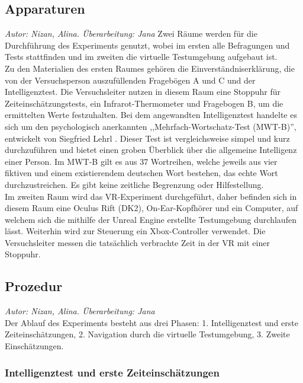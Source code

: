 \documentclass{Paper}
\begin{document}
        \subsection{Apparaturen}
                \textit{Autor: Nizan, Alina. Überarbeitung: Jana}
Zwei Räume werden für die Durchführung des Experiments genutzt, wobei im ersten alle Befragungen und Tests stattfinden und im zweiten die virtuelle Testumgebung aufgebaut ist.\\
Zu den Materialien des ersten Raumes gehören die Einverständniserklärung, die von der Versuchsperson auszufüllenden Fragebögen A und C und der Intelligenztest.
Die Versuchsleiter nutzen in diesem Raum eine Stoppuhr für Zeiteinschätzungstests, ein Infrarot-Thermometer und Fragebogen B, um die ermittelten Werte festzuhalten.
Bei dem angewandten Intelligenztest handelte es sich um den psychologisch anerkannten ,,Mehrfach-Wortschatz-Test (MWT-B)'', entwickelt von Siegfried Lehrl \cite{MWT-B}. Dieser Test ist vergleichsweise simpel und kurz durchzuführen und bietet einen groben Überblick über die allgemeine Intelligenz einer Person. 
Im MWT-B gilt es aus 37 Wortreihen, welche jeweils aus vier fiktiven und einem existierendem deutschen Wort bestehen, das echte Wort durchzustreichen. Es gibt keine zeitliche Begrenzung oder Hilfestellung.\\
Im zweiten Raum wird das VR-Experiment durchgeführt, daher befinden sich in diesem Raum eine Oculus Rift (DK2), On-Ear-Kopfhörer und ein Computer, auf welchem sich die mithilfe der Unreal Engine erstellte Testumgebung durchlaufen lässt. Weiterhin wird zur Steuerung ein Xbox-Controller verwendet. Die Versuchsleiter messen die tatsächlich verbrachte Zeit in der VR mit einer Stoppuhr.
\subsection{Prozedur}
        \textit{Autor: Nizan, Alina. Überarbeitung: Jana}\\
Der Ablauf des Experiments besteht aus drei Phasen: 1. Intelligenztest und erste Zeiteinschätzungen, 2. Navigation durch die virtuelle Testumgebung, 3. Zweite Einschätzungen.
\subsubsection{Intelligenztest und erste Zeiteinschätzungen}
\end{document}
